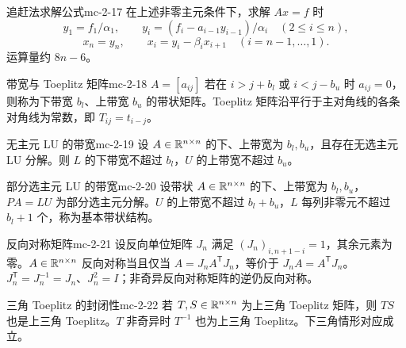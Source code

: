 \begin{proposition}{追赶法求解公式}{mc-2-17}
在上述非零主元条件下，求解 $Ax=f$ 时
\[
y_1=f_1/\alpha_1,\qquad y_i=(f_i-a_{i-1}y_{i-1})/\alpha_i\quad(2\leq i\leq n),
\]
\[x_n=y_n,\qquad x_i=y_i-\beta_i x_{i+1}\quad(i=n-1,\ldots,1).\]
运算量约 $8n-6$。
\end{proposition}

\begin{definition}{带宽与 Toeplitz 矩阵}{mc-2-18}
$A=[a_{ij}]$ 若在 $i>j+b_l$ 或 $i<j-b_u$ 时 $a_{ij}=0$，则称为下带宽 $b_l$、上带宽 $b_u$ 的带状矩阵。Toeplitz 矩阵沿平行于主对角线的各条对角线为常数，即 $T_{ij}=t_{i-j}$。
\end{definition}

\begin{theorem}{无主元 LU 的带宽}{mc-2-19}
设 $A\in\mathbb{R}^{n\times n}$ 的下、上带宽为 $b_l,b_u$，且存在无选主元 LU 分解。则 $L$ 的下带宽不超过 $b_l$，$U$ 的上带宽不超过 $b_u$。
\end{theorem}

\begin{theorem}{部分选主元 LU 的带宽}{mc-2-20}
设带状 $A\in\mathbb{R}^{n\times n}$ 的下、上带宽为 $b_l,b_u$，$PA=LU$ 为部分选主元分解。$U$ 的上带宽不超过 $b_l+b_u$，$L$ 每列非零元不超过 $b_l+1$ 个，称为基本带状结构。
\end{theorem}

\begin{lemma}{反向对称矩阵}{mc-2-21}
设反向单位矩阵 $J_n$ 满足 $(J_n)_{i,n+1-i}=1$，其余元素为零。$A\in\mathbb{R}^{n\times n}$ 反向对称当且仅当 $A=J_nA^{\mathsf T}J_n$，等价于 $J_nA=A^{\mathsf T}J_n$。$J_n^{\mathsf T}=J_n^{-1}=J_n$、$J_n^2=I$；非奇异反向对称矩阵的逆仍反向对称。
\end{lemma}

\begin{theorem}{三角 Toeplitz 的封闭性}{mc-2-22}
若 $T,S\in\mathbb{R}^{n\times n}$ 为上三角 Toeplitz 矩阵，则 $TS$ 也是上三角 Toeplitz。$T$ 非奇异时 $T^{-1}$ 也为上三角 Toeplitz。下三角情形对应成立。
\end{theorem}

